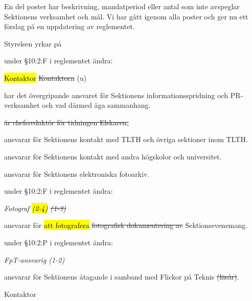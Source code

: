\documentclass[../main/handlingar.tex]{subfiles}
\begin{document}
En del poster har beskrivning, mandatperiod eller antal som inte avspeglar Sektionens verksamhet och mål. Vi har gått igenom alla poster och ger nu ett förslag på en uppdatering av reglementet.

Styrelsen yrkar på
\begin{attsatser}
    \att under \S10:2:F i reglementet ändra:\par
        \begin{itshape}
        \hl{Kontaktor} \sout{Kontaktorn} (u)
        \begin{itemizedash}
            \item har det övergripande ansvaret för Sektionens informationsspridning och PR-verksamhet
            och vad därmed äga sammanhang.
            \item \sout{är chefsredaktör för tidningen Elskaren,}
            \item ansvarar för Sektionens kontakt med TLTH och övriga sektioner inom TLTH.
            \item ansvarar för Sektionens kontakt med andra högskolor och universitet.
            \item ansvarar för Sektionens elektroniska fotoarkiv.
        \end{itemizedash}
        \end{itshape}

    \att under \S10:2:F i reglementet ändra:\par
    {\it
    Fotograf \hl{(2-4)} \sout{(1-3)}
    \begin{itemizedash}
        \item ansvarar för \hl{att fotografera} \sout{fotografisk dokumentering av} Sektionsevenemang.
    \end{itemizedash}
    }

    \att under \S10:2:P i reglementet ändra:\par
    {\it
    FpT-ansvarig (1-2)
    \begin{itemizedash}
        \item ansvarar för Sektionens åtagande i samband med Flickor på Teknis \sout{(läsår)}.
    \end{itemizedash}
    }
\end{attsatser}

\begin{signatures}{1}
    \ist
    \signature{Erik Månsson}{Kontaktor}
\end{signatures}
\end{document}
